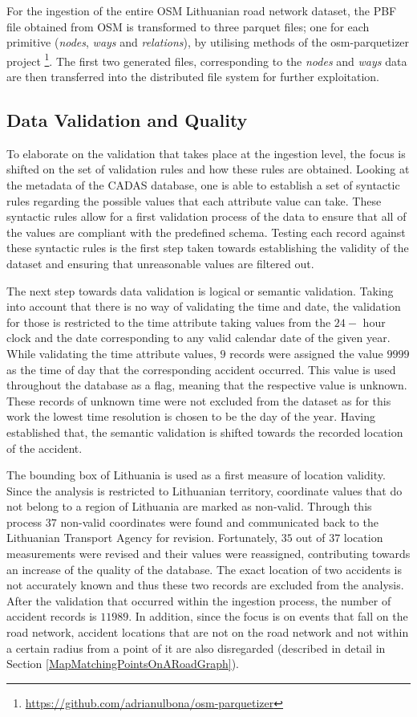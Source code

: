 \documentclass[12pt]{article}
\theoremstyle{definition}
\begin{document}
For the ingestion of the entire OSM Lithuanian road network dataset, the PBF file obtained from OSM is transformed to three parquet files; one for each primitive (\textit{nodes}, \textit{ways} and \textit{relations}), by utilising methods of the osm-parquetizer project \footnote{\url{https://github.com/adrianulbona/osm-parquetizer}}. The first two generated files, corresponding to the \textit{nodes} and \textit{ways} data are then transferred into the distributed file system for further exploitation.  


\subsection{Data Validation and Quality}\label{DataValidationAndQuality}
To elaborate on the validation that takes place at the ingestion level, the focus is shifted on the set of validation rules and how these rules are obtained. Looking at the metadata of the CADAS database, one is able to establish a set of syntactic rules regarding the possible values that each attribute value can take. These syntactic rules allow for a first validation process of the data to ensure that all of the values are compliant with the predefined schema. Testing each record against these syntactic rules is the first step taken towards establishing the validity of the dataset and ensuring that unreasonable values are filtered out. 

The next step towards data validation is logical or semantic validation. Taking into account that there is no way of validating the time and date, the validation for those is restricted to the time attribute taking values from the $24-$ hour clock and the date corresponding to any valid calendar date of the given year. While validating the time attribute values, $9$ records were assigned the value $9999$ as the time of day that the corresponding accident occurred. This value is used throughout the database as a flag, meaning that the respective value is unknown. These records of unknown time were not excluded from the dataset as for this work the lowest time resolution is chosen to be the day of the year. Having established that, the semantic validation is shifted towards the recorded location of the accident.

The bounding box of Lithuania is used as a first measure of location validity. Since the analysis is restricted to Lithuanian territory, coordinate values that do not belong to a region of Lithuania are marked as non-valid. Through this process $37$ non-valid coordinates were found and communicated back to the Lithuanian Transport Agency for revision. Fortunately, $35$ out of $37$ location measurements were revised and their values were reassigned, contributing towards an increase of the quality of the database. The exact location of two accidents is not accurately known and thus these two records are excluded from the analysis. After the validation that occurred within the ingestion process, the number of accident records is $11989$. In addition, since the focus is on events that fall on the road network, accident locations that are not on the road network and not within a certain radius from a point of it are also disregarded (described in detail in Section \ref{MapMatchingPointsOnARoadGraph}). 
\end{document}
